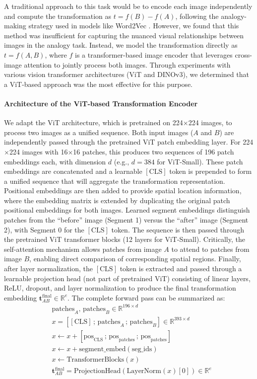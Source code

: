 \documentclass[twocolumn]{article} %
\begin{document}
A traditional approach to this task would be to encode each image independently and compute the transformation as \(t = f(B) - f(A)\), following the analogy-making strategy used in models like Word2Vec \cite{mikolov2013efficient}. However, we found that this method was insufficient for capturing the nuanced visual relationships between images in the analogy task. Instead, we model the transformation directly as \(t = f(A, B)\), where $f$ is a transformer-based image encoder that leverages cross-image attention to jointly process both images. Through experiments with various vision transformer architectures (ViT and DINOv3), we determined that a ViT-based approach was the most effective for this purpose.

\paragraph{Architecture of the ViT-based Transformation Encoder}
We adapt the ViT architecture, which is pretrained on 224$\times$224 images, to process two images as a unified sequence. Both input images ($A$ and $B$) are independently passed through the pretrained ViT patch embedding layer. For 224$\times$224 images with 16$\times$16 patches, this produces two sequences of 196 patch embeddings each, with dimension $d$ (e.g., $d=384$ for ViT-Small). These patch embeddings are concatenated and a learnable $[\text{CLS}]$ token is prepended to form a unified sequence that will aggregate the transformation representation. Positional embeddings are then added to provide spatial location information, where the embedding matrix is extended by duplicating the original patch positional embeddings for both images. Learned segment embeddings distinguish patches from the ``before'' image (Segment 1) versus the ``after'' image (Segment 2), with Segment 0 for the $[\text{CLS}]$ token. The sequence is then passed through the pretrained ViT transformer blocks (12 layers for ViT-Small). Critically, the self-attention mechanism allows patches from image $A$ to attend to patches from image $B$, enabling direct comparison of corresponding spatial regions. Finally, after layer normalization, the $[\text{CLS}]$ token is extracted and passed through a learnable projection head (not part of pretrained ViT) consisting of linear layers, ReLU, dropout, and layer normalization to produce the final transformation embedding $\mathbf{t}_{AB}^{\text{final}} \in \mathbb{R}^{e}$.
The complete forward pass can be summarized as:
\begin{align*}
    &\text{patches}_A,\, \text{patches}_B \in \mathbb{R}^{196 \times d} \\
    &x = [\![\text{CLS}]\,;\, \text{patches}_A\,;\, \text{patches}_B] \in \mathbb{R}^{393 \times d} \\
    &x \leftarrow x + [\text{pos}_{\text{CLS}}\,;\, \text{pos}_{\text{patches}}\,;\, \text{pos}_{\text{patches}}] \\
    &x \leftarrow x + \text{segment\_embed}(\text{seg\_ids}) \\
    &x \leftarrow \text{TransformerBlocks}(x) \\
    &\mathbf{t}_{AB}^{\text{final}} = \text{ProjectionHead}(\text{LayerNorm}(x)[0]) \in \mathbb{R}^{e}
\end{align*}
\end{document}
